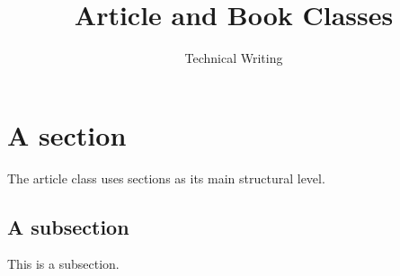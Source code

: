 \documentclass[12pt,a4paper]{article}
\begin{document}
\title{Article and Book Classes}
\author{Technical Writing}
\maketitle

\section{A section}
The article class uses sections as its main structural level.


\subsection{A subsection}
This is a subsection.
\end{document}
